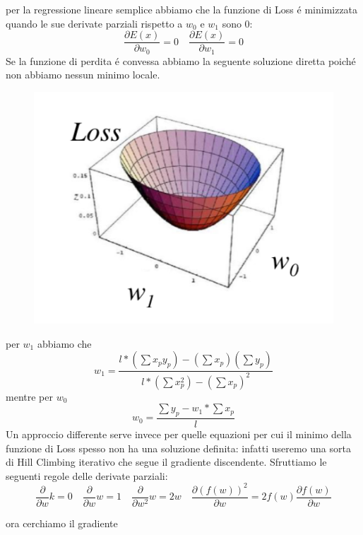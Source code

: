 \documentclass{article}
\begin{document}
per la regressione lineare semplice abbiamo che la funzione di Loss é minimizzata quando le sue derivate parziali rispetto a $w_0$ e $w_1$ sono 0:
\begin{equation}
    \frac{\partial E(x)}{\partial w_0} = 0 \quad \frac{\partial E(x)}{\partial w_1} = 0
\end{equation}
Se la funzione di perdita é convessa abbiamo la seguente soluzione diretta poiché non abbiamo nessun minimo locale. 
\begin{figure}[H]
    \centering
    \includegraphics[scale=0.8]{Images/convexlocalmin.png}
\end{figure}
per $w_1$ abbiamo che
\begin{equation}
    w_1 = \frac{l * (\sum x_py_p) - (\sum x_p) (\sum y_p)}{l * (\sum x_p^2) - (\sum x_p)^2}
\end{equation}
mentre per $w_0$
\begin{equation}
    w_0 = \frac{\sum y_p - w_1 * \sum x_p}{l}
\end{equation}
Un approccio differente serve invece per quelle equazioni per cui il minimo della funzione di Loss spesso non ha una soluzione definita: infatti useremo una sorta di Hill Climbing iterativo che segue il gradiente discendente. Sfruttiamo le seguenti regole delle derivate parziali:
\begin{equation}
   \frac{\partial}{\partial w}k = 0 \quad \frac{\partial}{\partial w}w = 1 \quad \frac{\partial}{\partial w^2}w = 2w \quad \frac{\partial (f(w))^2}{\partial w} = 2f(w) \frac{\partial f(w)}{\partial w}
\end{equation}

ora cerchiamo il gradiente
\end{document}
